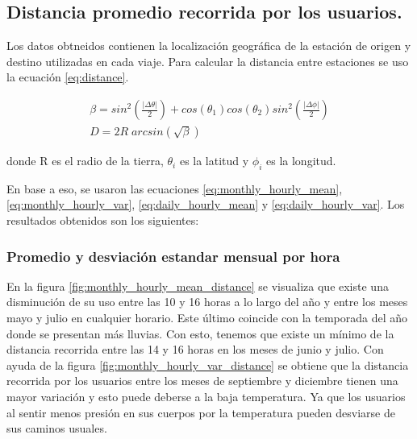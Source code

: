 \subsection{Distancia promedio recorrida por los usuarios.}

Los datos obtneidos contienen la localización geográfica de la estación de origen y destino utilizadas en cada viaje. Para calcular la distancia entre estaciones se uso la ecuación \ref{eq:distance}.

\begin{equation}
    \begin{matrix}
        \beta = sin^2\left ( \frac{|\Delta \theta|}{2} \right ) + cos \left (\theta_1\right )  cos(\theta_2)sin^2 \left (\frac{|\Delta \phi|}{2} \right ) \\
        D     = 2R\;arcsin\left (\sqrt{\beta} \right )
    \end{matrix}
    \label{eq:distance}
\end{equation}

donde R es el radio de la tierra, $\theta_i$ es la latitud y $\phi_i$ es la longitud.

En base a eso, se usaron las ecuaciones \ref{eq:monthly_hourly_mean}, \ref{eq:monthly_hourly_var}, \ref{eq:daily_hourly_mean} y \ref{eq:daily_hourly_var}. Los resultados obtenidos son los siguientes:

\subsubsection{Promedio y desviación estandar mensual por hora}

En la figura \ref{fig:monthly_hourly_mean_distance} se visualiza que existe una disminución de su uso entre las 10 y 16 horas a lo largo del año y entre los meses mayo y julio en cualquier horario. Este último coincide con la temporada del año donde se presentan más lluvias\cite{clima_guadalajara}. Con esto, tenemos que existe un mínimo de la distancia recorrida entre las 14 y 16 horas en los meses de junio y julio. Con ayuda de la figura \ref{fig:monthly_hourly_var_distance} se obtiene que la distancia recorrida por los usuarios entre los meses de septiembre y diciembre tienen una mayor variación y esto puede deberse a la baja temperatura\cite{clima_guadalajara}. Ya que los usuarios al sentir menos presión en sus cuerpos por la temperatura pueden desviarse de sus caminos usuales.

